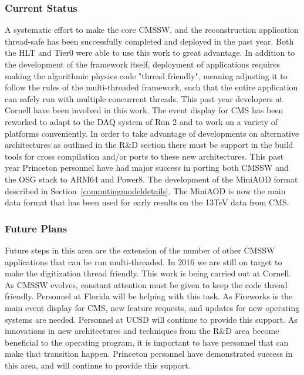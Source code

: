 \documentclass[11pt,a4paper]{article}
\begin{document}
\subsubsection{Current Status}
A systematic effort to make the core CMSSW, and the reconstruction application thread-safe has been successfully completed and deployed in the past year.  Both the HLT and Tier0 were able to use this work to great advantage. In addition to the development of the framework itself, deployment of applications requires making the algorithmic physics code "thread friendly", meaning adjusting it to follow the rules of the multi-threaded framework, such that the entire application can safely run with multiple concurrent threads.  This past year developers at Cornell have been involved in this work.
The event display for CMS has been reworked to adapt to the DAQ system of Run 2 and to work on a variety of platforms conveniently.
In order to take advantage of developments on alternative architectures as outlined in the R\&D section there must be support in the build tools for cross compilation and/or ports to these new architectures. This past year Princeton personnel have had major success in porting both CMSSW and the OSG stack to ARM64 and Power8.
The development of the MiniAOD format described in Section~\ref{computingmodeldetails}.  
The MiniAOD is now the main data format that has been used for early results on the 13TeV data from CMS.

\subsubsection{Future Plans}
Future steps in this area are the extension of the number of other CMSSW applications that can be run multi-threaded.  In 2016 we are still on target to make the digitization thread friendly.  This work is being carried out at Cornell.  As CMSSW evolves, constant attention must be given to keep the code thread friendly.  Personnel at Florida will be helping with this task.
As Fireworks is the main event display for CMS, new feature requests, and updates for new operating systems are needed.  Personnel at UCSD will continue to provide this support. 
As innovations in new architectures and techniques from the R\&D area become beneficial to the operating program, it is important to have personnel that can make that transition happen.  Princeton personnel have demonstrated success in this area, and will continue to provide this support.
\end{document}
